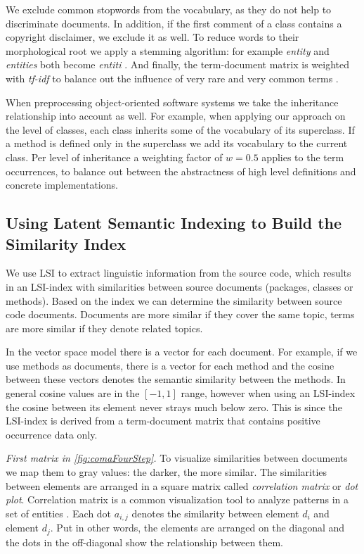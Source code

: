 \documentclass[10pt]{book}
\begin{document}
We exclude common stopwords from the vocabulary, as they do not help to discriminate documents. In addition, if the first comment of a class contains a copyright disclaimer, we exclude it as well. To reduce words to their morphological root we apply a stemming algorithm: for example \emph{entity} and \emph{entities} both become \emph{entiti} \cite{Port80a}. And finally, the term-document matrix is weighted with \emph{tf-idf} to balance out the influence of very rare and very common terms \cite{Duma91a}.

When preprocessing object-oriented software systems we take the inheritance relationship into account as well. For example, when applying our approach on the level of classes, each class inherits some of the vocabulary of its superclass. If a method is defined only in the superclass we add its vocabulary to the current class. Per level of inheritance a weighting factor of $w = 0.5$ applies to the term occurrences, to balance out between the abstractness of high level definitions and concrete implementations.

\subsection{Using Latent Semantic Indexing to Build the Similarity Index}
\label{sec:lsi}

We use LSI to extract linguistic information from the source code, which results in an LSI-index with similarities between source documents (\ie packages, classes or methods). Based on the index we can determine the similarity between source code documents. Documents are more similar if they cover the same topic, terms are more similar if they denote related topics.

In the vector space model there is a vector for each document. For example, if we use methods as documents, there is a vector for each method and the cosine between these vectors denotes the semantic similarity between the methods. In general cosine values are in the $[-1,1]$ range, however when using an LSI-index the cosine between its element never strays much below zero. This is since the LSI-index is derived from a term-document matrix that contains positive occurrence data only.

\emph{First matrix in \autoref{fig:comaFourStep}.} To visualize similarities between documents we map them to gray values: the darker, the more similar. The similarities between elements are arranged in a square matrix called \emph{correlation matrix} or \emph{dot plot}. Correlation matrix is a common visualization tool to analyze patterns in a set of entities \cite{Ling73a}. Each dot $a_{i,j}$ denotes the similarity between element $d_i$ and element $d_j$. Put in other words, the elements are arranged on the diagonal and the dots in the off-diagonal show the relationship between them.
\end{document}
